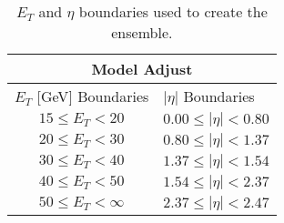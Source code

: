 \begin{comment}
\begin{table}[htb]
	\begin{center}
		{\small
			\begin{tabular}{cccc}
				\hline \hline
				\multicolumn{4}{c}{Model Adjust} \\ \hline \hline
				\multicolumn{4}{c}{$E_{T}$ {[}GeV{]} Boundaries} \\ \hline
				\multicolumn{4}{c}{$15 \leq E_T < 20 $}  \\
				\multicolumn{4}{c}{$20 \leq E_T < 30$}  \\
				\multicolumn{4}{c}{$30 \leq E_T < 40$} \\
				\multicolumn{4}{c}{$40 \leq E_T < 50$} \\
				\multicolumn{4}{c}{$50 \leq E_T < \infty$} \\\hline
				\multicolumn{4}{c}{$|\eta|$ Boundaries} \\ \hline
				\multicolumn{4}{c}{$0,0 \leq |\eta| < 0,8 $}  \\
				\multicolumn{4}{c}{$0,8 \leq |\eta| < 1,37$}  \\
				\multicolumn{4}{c}{$1,37 \leq |\eta| < 1,54$} \\
				\multicolumn{4}{c}{$1,54 \leq |\eta| < 2,37$} \\ 
				\multicolumn{4}{c}{$2,37 \leq |\eta| < 2,47$} \\ 
				\hline
				\hline
			\end{tabular}
		}
	\end{center}
	\caption{$E_T$ and $\eta$ boundaries used to create the ensemble.}
\end{table}

\end{comment}



\begin{table}[htb]
\begin{center}
	{\small
	\begin{tabular}{cccc}
		\hline \hline
		\multicolumn{4}{c}{Model Adjust}                                                                 \\ \hline
		\multicolumn{2}{c|}{$E_T$ {[}GeV{]} Boundaries} & \multicolumn{2}{l}{$|\eta|$ Boundaries}        \\ \hline
		\multicolumn{2}{c|}{$15 \leq E_T < 20 $}        & \multicolumn{2}{l}{$0.00 \leq |\eta| < 0.80 $}   \\
		\multicolumn{2}{c|}{$20 \leq E_T < 30 $}        & \multicolumn{2}{l}{$0.80 \leq |\eta| < 1.37 $}  \\
		\multicolumn{2}{c|}{$30 \leq E_T < 40 $}        & \multicolumn{2}{l}{$1.37 \leq |\eta| < 1.54 $} \\
		\multicolumn{2}{c|}{$40 \leq E_T < 50 $}        & \multicolumn{2}{l}{$1.54 \leq |\eta| < 2.37 $} \\
		\multicolumn{2}{c|}{$50 \leq E_T < \infty $}    & \multicolumn{2}{l}{$2.37 \leq |\eta| < 2.47 $} \\ \hline \hline
	\end{tabular}
}
\end{center}
\caption{$E_T$ and $\eta$ boundaries used to create the ensemble.}
\label{tab:ensemble_regions}
\end{table}